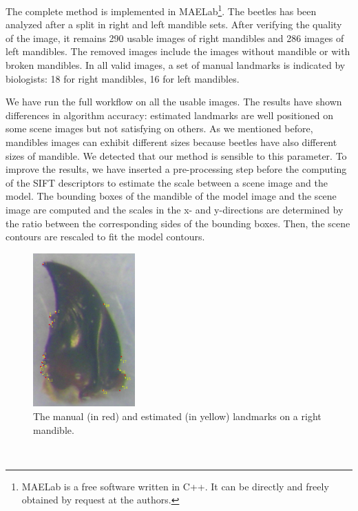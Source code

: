 \documentclass[twoside,twocolumn,10pt]{article}
\begin{document}
The complete method is implemented in MAELab\footnote{MAELab
  is a free software written in C++. It can be directly and freely obtained by request
  at the authors.}.
The beetles has been analyzed after a split in right and left mandible sets.
After verifying the quality of the image, it remains 290 usable images of right mandibles and 286 images of left mandibles.
The removed images include the images without mandible or with broken mandibles.
In all valid images, a set of manual landmarks is indicated by biologists: 18 for right mandibles, 16 for left mandibles.

We have run the full workflow on all the usable images.
The results have shown differences in algorithm accuracy: estimated landmarks are well positioned on some scene images but not satisfying on others.
As we mentioned before, mandibles images can exhibit different sizes because beetles have also different sizes of mandible.
We detected that our method is sensible to this parameter.
To improve the results, we have inserted a pre-processing step before the computing of the SIFT descriptors to estimate the scale between a scene image and the model.
The bounding boxes of the mandible of the model image and the scene image are computed and the scales in the x- and y-directions are determined by the ratio between the corresponding sides of the bounding boxes.
Then, the scene contours are rescaled to fit the model contours. \\
\begin{figure}[h]
\centering
\includegraphics[width=0.35\textwidth]{./images/md_rs}
\caption{The manual (in red) and estimated (in yellow) landmarks on a right mandible.}
\label{figresult}
\end{figure}~\\
\end{document}
